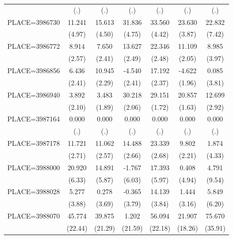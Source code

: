 {\begin{tabular}{l*{6}{c}}
                    &         (.)&         (.)&         (.)&         (.)&         (.)&         (.)\\
PLACE=3986730       &      11.241&      15.613&      31.836&      33.560&      23.630&      22.832\\
                    &      (4.97)&      (4.50)&      (4.75)&      (4.42)&      (3.87)&      (7.42)\\
PLACE=3986772       &       8.914&       7.650&      13.627&      22.346&      11.109&       8.985\\
                    &      (2.57)&      (2.41)&      (2.49)&      (2.48)&      (2.05)&      (3.97)\\
PLACE=3986856       &       6.436&      10.945&      -4.540&      17.192&      -4.622&       0.085\\
                    &      (2.41)&      (2.29)&      (2.41)&      (2.37)&      (1.96)&      (3.81)\\
PLACE=3986940       &       3.892&       3.483&      30.218&      29.151&      20.857&      12.699\\
                    &      (2.10)&      (1.89)&      (2.06)&      (1.72)&      (1.63)&      (2.92)\\
PLACE=3987164       &       0.000&       0.000&       0.000&       0.000&       0.000&       0.000\\
                    &         (.)&         (.)&         (.)&         (.)&         (.)&         (.)\\
PLACE=3987178       &      11.721&      11.062&      14.488&      23.339&       9.802&       1.874\\
                    &      (2.71)&      (2.57)&      (2.66)&      (2.68)&      (2.21)&      (4.33)\\
PLACE=3988000       &      20.920&      14.891&      -1.767&      17.393&       0.408&       4.791\\
                    &      (6.33)&      (5.87)&      (6.03)&      (5.97)&      (4.94)&      (9.54)\\
PLACE=3988028       &       5.277&       0.278&      -0.365&      14.139&       1.444&       5.849\\
                    &      (3.88)&      (3.69)&      (3.79)&      (3.84)&      (3.16)&      (6.20)\\
PLACE=3988070       &      45.774&      39.875&       1.202&      56.094&      21.907&      75.670\\
                    &     (22.44)&     (21.29)&     (21.59)&     (22.18)&     (18.26)&     (35.91)\\

\end{tabular}}
